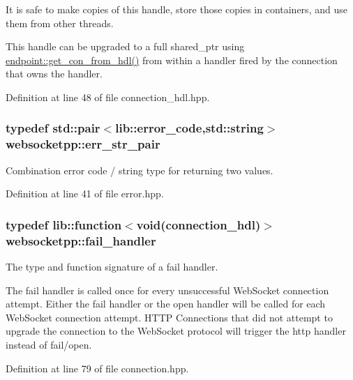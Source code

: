 It is safe to make copies of this handle, store those copies in containers, and use them from other threads.

This handle can be upgraded to a full shared\+\_\+ptr using {\ttfamily \hyperlink{classwebsocketpp_1_1endpoint_a0fe4457427d4124abe7ca022ba7afbb4}{endpoint\+::get\+\_\+con\+\_\+from\+\_\+hdl()}} from within a handler fired by the connection that owns the handler. 

Definition at line 48 of file connection\+\_\+hdl.\+hpp.

\hypertarget{namespacewebsocketpp_abecf95d53c9387716b157daae84441f3}{}
\subsubsection[{err\+\_\+str\+\_\+pair}]{\setlength{\rightskip}{0pt plus 5cm}typedef std\+::pair$<$lib\+::error\+\_\+code,std\+::string$>$ {\bf websocketpp\+::err\+\_\+str\+\_\+pair}}\label{namespacewebsocketpp_abecf95d53c9387716b157daae84441f3}


Combination error code / string type for returning two values. 



Definition at line 41 of file error.\+hpp.

\hypertarget{namespacewebsocketpp_a5bb2e61cfe649b2e012f1a2c5693a4d5}{}
\subsubsection[{fail\+\_\+handler}]{\setlength{\rightskip}{0pt plus 5cm}typedef lib\+::function$<$void({\bf connection\+\_\+hdl})$>$ {\bf websocketpp\+::fail\+\_\+handler}}\label{namespacewebsocketpp_a5bb2e61cfe649b2e012f1a2c5693a4d5}


The type and function signature of a fail handler. 

The fail handler is called once for every unsuccessful Web\+Socket connection attempt. Either the fail handler or the open handler will be called for each Web\+Socket connection attempt. H\+T\+T\+P Connections that did not attempt to upgrade the connection to the Web\+Socket protocol will trigger the http handler instead of fail/open. 

Definition at line 79 of file connection.\+hpp.

